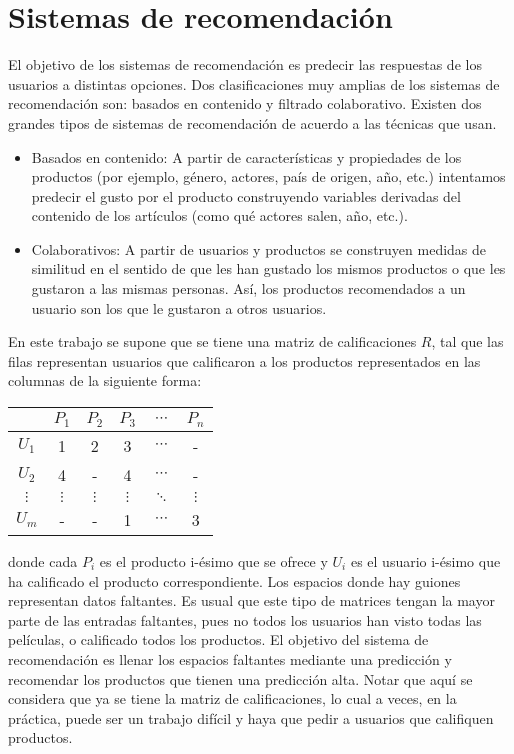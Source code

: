 \section{Sistemas de recomendación}

El objetivo de los sistemas de recomendación es predecir las respuestas de los usuarios a distintas opciones. Dos clasificaciones muy amplias de los sistemas de recomendación son: basados en contenido y filtrado colaborativo. Existen dos grandes tipos de sistemas de recomendación de acuerdo a las técnicas que usan.

\begin{itemize}
\item Basados en contenido: A partir de características y propiedades de los productos (por ejemplo, género, actores, país de origen, año, etc.) intentamos predecir el gusto por el producto construyendo variables derivadas del contenido de los artículos (como qué actores salen, año, etc.).
\item Colaborativos: A partir de usuarios y productos se construyen medidas de similitud en el sentido de que les han gustado los mismos productos o que les gustaron a las mismas personas. Así, los productos recomendados a un usuario son los que le gustaron a otros usuarios.
\end{itemize}

En este trabajo se supone que se tiene una matriz de calificaciones $R$, tal que las filas representan usuarios que calificaron a los productos representados en las columnas de la siguiente forma:

\begin{center}
\begin{tabular}{ c | c  c c c c}
    & $P_1$ & $P_2$ & $P_3$ & $\cdots$ & $P_n$ \\
  \hline                       
  $U_1$ &   1 &     2 &     3 & $\cdots$ &      - \\
  $U_2$ &   4 &     - &     4 & $\cdots$  &     -\\
  $\vdots$ & $\vdots$ & $\vdots$ & $\vdots$ & $\ddots$ & $\vdots$\\
  $U_m$ &   - &     - &     1 & $\cdots$ &      3\\
  \hline  
\end{tabular}
\end{center}

donde cada $P_i$ es el producto i-ésimo que se ofrece y $U_i$ es el usuario i-ésimo que ha calificado el producto correspondiente. Los espacios donde hay guiones representan datos faltantes. Es usual que este tipo de matrices tengan la mayor parte de las entradas faltantes, pues no todos los usuarios han visto todas las películas, o calificado todos los productos. El objetivo del sistema de recomendación es llenar los espacios faltantes mediante una predicción y recomendar los productos que tienen una predicción alta. Notar que aquí se considera que ya se tiene la matriz de calificaciones, lo cual a veces, en la práctica, puede ser un trabajo difícil y haya que pedir a usuarios que califiquen productos.

